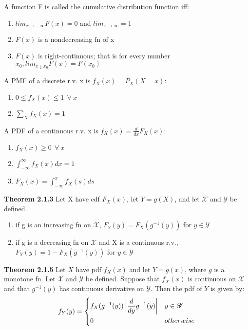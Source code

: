\documentclass[14pt, oneside, letterpaper]{notes}
\begin{document}
\begin{mydef}
	A function F is called the cumulative distribution
	function iff: 
	\begin{enumerate}
	\item $lim_{x \to -\infty}F(x)=0$ and $lim_{x \to \infty}=1$
	\item $F(x)$ is a nondecreasing fn of x
	\item $F(x)$ is right-continuous; that is for every number 
	$x_0, lim_{x \downarrow x_0} F(x) = F(x_0)$
	\end{enumerate}
\end{mydef}

\begin{mydef}
	A PMF of a discrete r.v. x is $f_X(x)=P_X(X=x)$:
	\begin{enumerate}
	\item $0 \leq f_X(x) \leq 1 \: \: \forall \: x$
	\item $\sum_X f_X(x) = 1$
	\end{enumerate}
\end{mydef}

\begin{mydef}
	A PDF of a continuous r.v. x is $f_X(x)= \frac{d}{dx}F_X(x)$:
	\begin{enumerate}
	\item $f_X(x) \geq 0 \: \: \forall \: x$
	\item $\int_{-\infty}^{\infty}f_X(x)dx = 1$
	\item $F_X(x) = \int_{-\infty}^{x}f_X(s)ds $
	\end{enumerate}
\end{mydef}

\begin{remark}
	\textbf{Theorem 2.1.3} Let X have cdf $F_X(x)$, let $Y = g(X)$,
	and let $\mathscr{X}$ and $\mathscr{Y}$ be defined.
	\begin{enumerate}
	\item if g is an increasing fn on $\mathscr{X}$, $F_Y(y) = 
	F_X(g^{-1}(y)) $ for $y \in \mathscr{Y}$
	\item if g is a decreasing fn on $\mathscr{X}$ and X is
	a continuous r.v., $F_Y(y) = 1- F_X(g^{-1}(y)) $ for 
	$y \in \mathscr{Y}$
	\end{enumerate}
\end{remark}

\begin{remark}
	\textbf{Theorem 2.1.5} Let $X$ have pdf $f_X(x)$ and let $Y = g(x)$,
	where $g$ is a monotone fn.  Let $\mathscr{X}$ and $\mathscr{Y}$ be
	defined.  Suppose that $f_X(x)$ is continuous on $\mathscr{X}$ and
	that $g^{-1}(y)$ has continuous derivative on $\mathscr{Y}$. Then
	the pdf of $Y$ is given by:
	\[ f_Y(y) =  
		\begin{dcases}
			f_X(g^{-1}(y)) \left| \frac{d}{dy}g^{-1}(y)\right| 
			& y \in \mathscr{Y} \\
			0 & otherwise
		\end{dcases}	
	\]
	
\end{remark}
\end{document}
